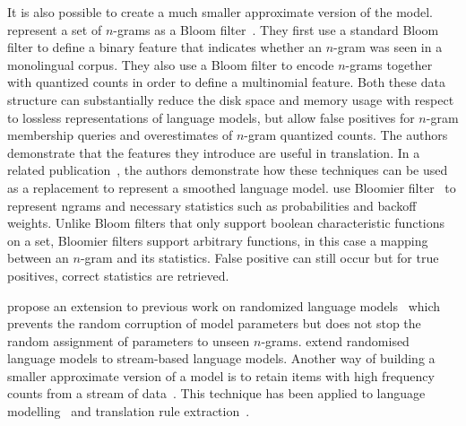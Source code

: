 It is also possible to create a much smaller approximate version of the model.
\citet{talbot-osborne:2007:ACL} represent a set of $n$-grams as a Bloom
filter~\citep{bloom:1970:ACM}.
They first use a standard Bloom filter to define a binary feature that
indicates whether an $n$-gram was seen in a monolingual corpus. They
also use a Bloom filter to encode $n$-grams together with quantized counts
in order to define a multinomial feature. Both these data structure can
substantially reduce the disk space and memory usage with respect to lossless
representations of language models, but allow false positives for $n$-gram
membership queries and overestimates of $n$-gram quantized counts. The authors
demonstrate that the features they introduce are useful in translation.
In a related publication~\citep{talbot-osborne:2007:EMNLP-CoNLL}, the authors
demonstrate how these techniques can be used as a replacement to represent
a smoothed language model. \citet{talbot-brants:2008:ACL} use Bloomier
filter~\citep{chazelle-kilian-rubinfeld-tal:2004:ACM-SIAM}
to represent ngrams and necessary statistics such as probabilities and backoff
weights. Unlike Bloom filters that only support boolean characteristic
functions on a set, Bloomier filters support arbitrary functions, in this case
a mapping between an $n$-gram and its statistics. False positive can still occur
but for true positives, correct statistics are retrieved.


\citet{guthrie-hepple:2010:EMNLP} propose an extension to previous work
on randomized language models~\citep{talbot-osborne:2007:EMNLP-CoNLL} which prevents
the random corruption of model parameters but does not stop the random
assignment of parameters to unseen $n$-grams.
\citet{levenberg-osborne:2009:EMNLP} extend randomised language models to
stream-based language models. Another way of building a smaller approximate
version of a model is to retain items with high frequency counts from a stream
of data~\citep{manku-motwani:2002:VLDB}. This technique has been applied to
language modelling~\citep{goyal-daumeiii-venkatasubramanian:2009:NAACL} and
translation rule extraction~\citep{przywara-bojar:2011:PBML}. 



